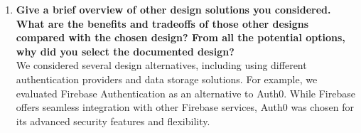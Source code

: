 \documentclass[12pt, titlepage]{article}
\begin{document}
\begin{enumerate}
  \item \textbf{Give a brief overview of other design solutions you considered. What are the benefits and tradeoffs of those other designs compared with the chosen design? From all the potential options, why did you select the documented design?}  \\
  We considered several design alternatives, including using different authentication providers and data storage solutions. For example, we evaluated Firebase Authentication as an alternative to Auth0. While Firebase offers seamless integration with other Firebase services, Auth0 was chosen for its advanced security features and flexibility.
\end{enumerate}
\end{document}
